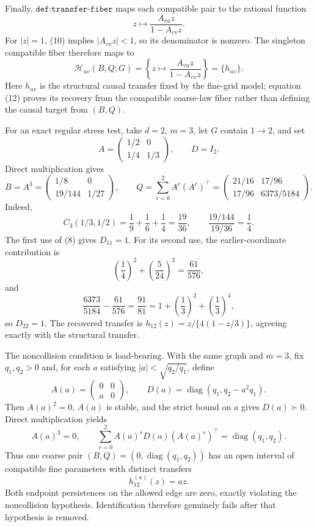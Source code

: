 Finally, \(\texttt{def:transfer-fiber}\) maps each compatible pair to the rational function
\[
z\longmapsto \frac{A_{vu}z}{1-A_{vv}z}.
\]
For \(|z|=1\), (10) implies \(|A_{vv}z|<1\), so its denominator is nonzero.  The singleton compatible fiber therefore maps to
\[
\mathcal H_{uv}(B,Q;G)
=\left\{z\longmapsto\frac{A_{vu}z}{1-A_{vv}z}\right\}
=\{h_{uv}\}. \tag{12}
\]
Here \(h_{uv}\) is the structural causal transfer fixed by the fine-grid model; equation (12) proves its recovery from the compatible coarse-law fiber rather than defining the causal target from \((B,Q)\).

For an exact regular stress test, take \(d=2\), \(m=3\), let \(G\) contain \(1\to2\), and set
\[
A=\begin{pmatrix}1/2&0\\[2pt]1/4&1/3\end{pmatrix},
\qquad D=I_2.
\]
Direct multiplication gives
\[
B=A^3
=\begin{pmatrix}1/8&0\\[2pt]19/144&1/27\end{pmatrix},
\qquad
Q=\sum_{r=0}^{2}A^r(A^r)^\top
=\begin{pmatrix}21/16&17/96\\[2pt]17/96&6373/5184\end{pmatrix}.
\]
Indeed,
\[
C_3(1/3,1/2)=\frac19+\frac16+\frac14=\frac{19}{36},
\qquad
\frac{19/144}{19/36}=\frac14.
\]
The first use of (8) gives \(D_{11}=1\).  For its second use, the earlier-coordinate contribution is
\[
\left(\frac14\right)^2+\left(\frac5{24}\right)^2=\frac{61}{576},
\]
and
\[
\frac{6373}{5184}-\frac{61}{576}
=\frac{91}{81}
=1+\left(\frac13\right)^2+\left(\frac13\right)^4,
\]
so \(D_{22}=1\).  The recovered transfer is \(h_{12}(z)=z/\{4(1-z/3)\}\), agreeing exactly with the structural transfer.

The noncollision condition is load-bearing.  With the same graph and \(m=3\), fix \(q_1,q_2>0\) and, for each \(a\) satisfying \(|a|<\sqrt{q_2/q_1}\), define
\[
A(a)=\begin{pmatrix}0&0\\ a&0\end{pmatrix},
\qquad
D(a)=\operatorname{diag}(q_1,q_2-a^2q_1).
\]
Then \(A(a)^2=0\), \(A(a)\) is stable, and the strict bound on \(a\) gives \(D(a)\succ0\).  Direct multiplication yields
\[
A(a)^3=0,
\qquad
\sum_{r=0}^{2}A(a)^rD(a)(A(a)^r)^\top
=\operatorname{diag}(q_1,q_2).
\]
Thus one coarse pair \((B,Q)=(0,\operatorname{diag}(q_1,q_2))\) has an open interval of compatible fine parameters with distinct transfers
\[
h_{12}^{(a)}(z)=az.
\]
Both endpoint persistences on the allowed edge are zero, exactly violating the noncollision hypothesis.  Identification therefore genuinely fails after that hypothesis is removed.
